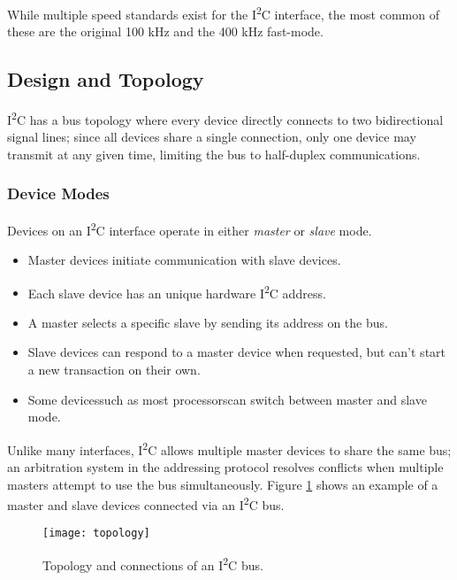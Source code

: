 \documentclass[openany,11pt,fleqn]{book} %
\begin{document}
    While multiple speed standards exist for the  I\textsuperscript{2}C interface, the most common of these are the original 100 kHz and the 400 kHz fast-mode.

    \subsection{\color{orange}Design and Topology}
            I\textsuperscript{2}C has a bus topology where every device directly connects to two bidirectional signal lines; since all devices share a single connection, only one device may transmit at any given time, limiting the bus to half-duplex communications. 

            \subsubsection{Device Modes}
            Devices on an I\textsuperscript{2}C interface operate in either \textit{master} or \textit{slave} mode. 
            \begin{itemize}
                \item Master devices initiate communication with slave devices.
                \item Each slave device has an unique hardware I\textsuperscript{2}C address.
                \item A master selects a specific slave by sending its address on the bus.
                \item Slave devices can respond to a master device when requested, but can't start a new transaction on their own.
                \item Some devices\textemdash such as most processors\textemdash can switch between master and slave mode.
            \end{itemize}
        
           Unlike many interfaces, I\textsuperscript{2}C allows multiple master devices to share the same bus; an arbitration system in the addressing protocol resolves conflicts when multiple masters attempt to use the bus simultaneously. Figure \ref{topology} shows an example of a master and slave devices connected via an I\textsuperscript{2}C bus. 

            \begin{figure}[]
                \centering\texttt{[image: topology]}
                \caption{Topology and connections of an I\textsuperscript{2}C bus.}
                \label{topology}
            \end{figure}
            
\end{document}
